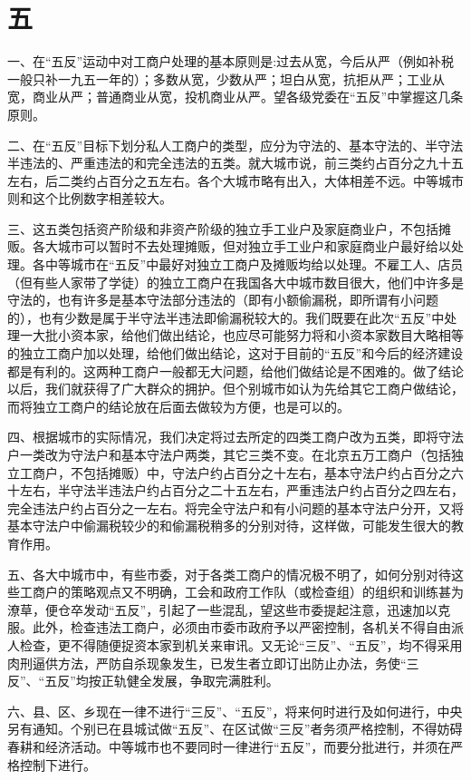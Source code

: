 \date{一九五二年三月五日}
\section*{五}

一、在“五反”运动中对工商户处理的基本原则是:过去从宽，今后从严（例如补税一般只补一九五一年的）；多数从宽，少数从严；坦白从宽，抗拒从严；工业从宽，商业从严；普通商业从宽，投机商业从严。望各级党委在“五反”中掌握这几条原则。

二、在“五反”目标下划分私人工商户的类型，应分为守法的、基本守法的、半守法半违法的、严重违法的和完全违法的五类。就大城市说，前三类约占百分之九十五左右，后二类约占百分之五左右。各个大城市略有出入，大体相差不远。中等城市则和这个比例数字相差较大。

三、这五类包括资产阶级和非资产阶级的独立手工业户及家庭商业户，不包括摊贩。各大城市可以暂时不去处理摊贩，但对独立手工业户和家庭商业户最好给以处理。各中等城市在“五反”中最好对独立工商户及摊贩均给以处理。不雇工人、店员（但有些人家带了学徒）的独立工商户在我国各大中城市数目很大，他们中许多是守法的，也有许多是基本守法部分违法的（即有小额偷漏税，即所谓有小问题的），也有少数是属于半守法半违法即偷漏税较大的。我们既要在此次“五反”中处理一大批小资本家，给他们做出结论，也应尽可能努力将和小资本家数目大略相等的独立工商户加以处理，给他们做出结论，这对于目前的“五反”和今后的经济建设都是有利的。这两种工商户一般都无大问题，给他们做结论是不困难的。做了结论以后，我们就获得了广大群众的拥护。但个别城市如认为先给其它工商户做结论，而将独立工商户的结论放在后面去做较为方便，也是可以的。

四、根据城市的实际情况，我们决定将过去所定的四类工商户改为五类，即将守法户一类改为守法户和基本守法户两类，其它三类不变。在北京五万工商户（包括独立工商户，不包括摊贩）中，守法户约占百分之十左右，基本守法户约占百分之六十左右，半守法半违法户约占百分之二十五左右，严重违法户约占百分之四左右，完全违法户约占百分之一左右。将完全守法户和有小问题的基本守法户分开，又将基本守法户中偷漏税较少的和偷漏税稍多的分别对待，这样做，可能发生很大的教育作用。

五、各大中城市中，有些市委，对于各类工商户的情况极不明了，如何分别对待这些工商户的策略观点又不明确，工会和政府工作队（或检查组）的组织和训练甚为潦草，便仓卒发动“五反”，引起了一些混乱，望这些市委提起注意，迅速加以克服。此外，检查违法工商户，必须由市委市政府予以严密控制，各机关不得自由派人检查，更不得随便捉资本家到机关来审讯。又无论“三反”、“五反”，均不得采用肉刑逼供方法，严防自杀现象发生，已发生者立即订出防止办法，务使“三反”、“五反”均按正轨健全发展，争取完满胜利。

六、县、区、乡现在一律不进行“三反”、“五反”，将来何时进行及如何进行，中央另有通知。个别已在县城试做“五反”、在区试做“三反”者务须严格控制，不得妨碍春耕和经济活动。中等城市也不要同时一律进行“五反”，而要分批进行，并须在严格控制下进行。


